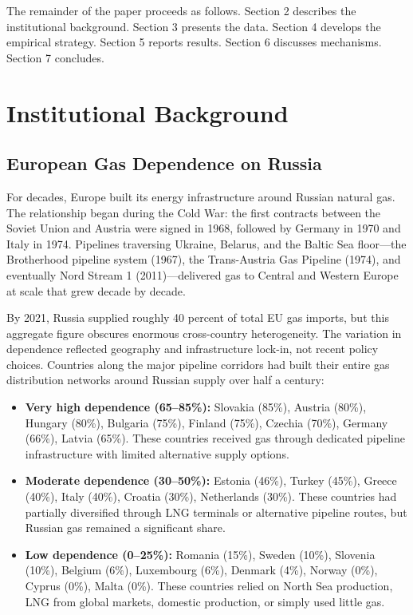 \documentclass[12pt]{article}
\begin{document}
The remainder of the paper proceeds as follows. Section 2 describes the institutional background. Section 3 presents the data. Section 4 develops the empirical strategy. Section 5 reports results. Section 6 discusses mechanisms. Section 7 concludes.


\section{Institutional Background}

\subsection{European Gas Dependence on Russia}

For decades, Europe built its energy infrastructure around Russian natural gas. The relationship began during the Cold War: the first contracts between the Soviet Union and Austria were signed in 1968, followed by Germany in 1970 and Italy in 1974. Pipelines traversing Ukraine, Belarus, and the Baltic Sea floor---the Brotherhood pipeline system (1967), the Trans-Austria Gas Pipeline (1974), and eventually Nord Stream 1 (2011)---delivered gas to Central and Western Europe at scale that grew decade by decade.

By 2021, Russia supplied roughly 40 percent of total EU gas imports, but this aggregate figure obscures enormous cross-country heterogeneity. The variation in dependence reflected geography and infrastructure lock-in, not recent policy choices. Countries along the major pipeline corridors had built their entire gas distribution networks around Russian supply over half a century:

\begin{itemize}
\item \textbf{Very high dependence (65--85\%):} Slovakia (85\%), Austria (80\%), Hungary (80\%), Bulgaria (75\%), Finland (75\%), Czechia (70\%), Germany (66\%), Latvia (65\%). These countries received gas through dedicated pipeline infrastructure with limited alternative supply options.
\item \textbf{Moderate dependence (30--50\%):} Estonia (46\%), Turkey (45\%), Greece (40\%), Italy (40\%), Croatia (30\%), Netherlands (30\%). These countries had partially diversified through LNG terminals or alternative pipeline routes, but Russian gas remained a significant share.
\item \textbf{Low dependence (0--25\%):} Romania (15\%), Sweden (10\%), Slovenia (10\%), Belgium (6\%), Luxembourg (6\%), Denmark (4\%), Norway (0\%), Cyprus (0\%), Malta (0\%). These countries relied on North Sea production, LNG from global markets, domestic production, or simply used little gas.
\end{itemize}
\end{document}
